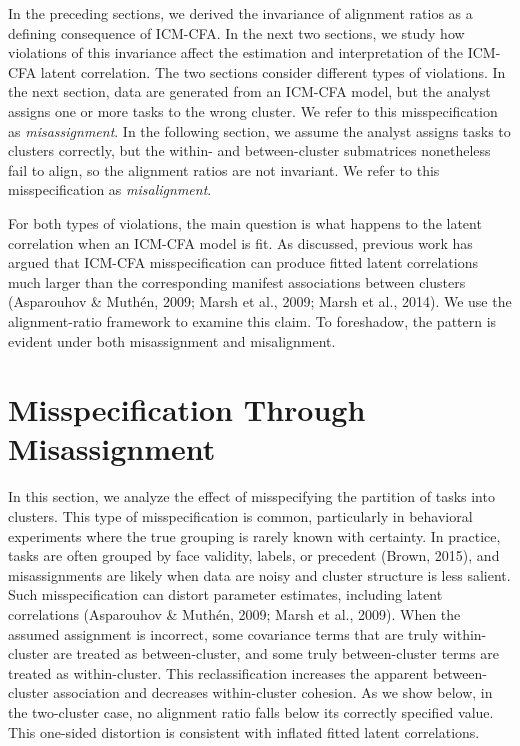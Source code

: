 \documentclass[
  american,
  man,floatsintext]{apa7}
\begin{document}
In the preceding sections, we derived the invariance of alignment ratios as a defining consequence of ICM-CFA. In the next two sections, we study how violations of this invariance affect the estimation and interpretation of the ICM-CFA latent correlation. The two sections consider different types of violations. In the next section, data are generated from an ICM-CFA model, but the analyst assigns one or more tasks to the wrong cluster. We refer to this misspecification as \emph{misassignment}. In the following section, we assume the analyst assigns tasks to clusters correctly, but the within- and between-cluster submatrices nonetheless fail to align, so the alignment ratios are not invariant. We refer to this misspecification as \emph{misalignment}.

For both types of violations, the main question is what happens to the latent correlation when an ICM-CFA model is fit. As discussed, previous work has argued that ICM-CFA misspecification can produce fitted latent correlations much larger than the corresponding manifest associations between clusters (Asparouhov \& Muthén, 2009; Marsh et al., 2009; Marsh et al., 2014). We use the alignment-ratio framework to examine this claim. To foreshadow, the pattern is evident under both misassignment and misalignment.

\section{Misspecification Through Misassignment}\label{misspecification-through-misassignment}

In this section, we analyze the effect of misspecifying the partition of tasks into clusters. This type of misspecification is common, particularly in behavioral experiments where the true grouping is rarely known with certainty. In practice, tasks are often grouped by face validity, labels, or precedent (Brown, 2015), and misassignments are likely when data are noisy and cluster structure is less salient. Such misspecification can distort parameter estimates, including latent correlations (Asparouhov \& Muthén, 2009; Marsh et al., 2009). When the assumed assignment is incorrect, some covariance terms that are truly within-cluster are treated as between-cluster, and some truly between-cluster terms are treated as within-cluster. This reclassification increases the apparent between-cluster association and decreases within-cluster cohesion. As we show below, in the two-cluster case, no alignment ratio falls below its correctly specified value. This one-sided distortion is consistent with inflated fitted latent correlations.
\end{document}
